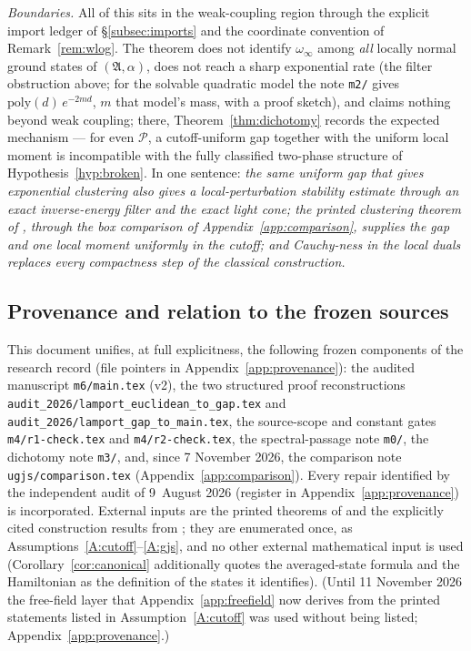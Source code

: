 \documentclass[11pt,a4paper]{article}
\theoremstyle{plain}
\theoremstyle{definition}
\theoremstyle{plain}
\theoremstyle{definition}
\newcommand{\A}{\mathfrak{A}}
\begin{document}
\emph{Boundaries.} All of this sits in the weak-coupling region through the explicit
import ledger of \S\ref{subsec:imports} and the coordinate convention of
Remark~\ref{rem:wlog}. The theorem does not identify $\omega_\infty$ among \emph{all}
locally normal ground states of $(\A,\alpha)$, does not reach a sharp exponential rate
(the filter obstruction above; for the solvable quadratic model the note \texttt{m2/} gives
$\mathrm{poly}(d)\,e^{-2md}$, $m$ that model's mass, with a proof sketch), and claims nothing
beyond weak coupling; there, Theorem~\ref{thm:dichotomy} records the expected mechanism --- for
even $\mathscr P$, a cutoff-uniform gap together with the uniform local moment is incompatible
with the fully classified two-phase structure of Hypothesis~\ref{hyp:broken}. In one sentence: \emph{the same uniform gap that gives
exponential clustering also gives a local-perturbation stability estimate through an
exact inverse-energy filter and the exact light cone; the printed clustering theorem of
\cite{GJS}, through the box comparison of Appendix~\ref{app:comparison}, supplies the gap
and one local moment uniformly in the cutoff; and
Cauchy-ness in the local duals replaces every compactness step of the classical
construction.}

\subsection*{Provenance and relation to the frozen sources}

This document unifies, at full explicitness, the following frozen components of the research
record (file pointers in Appendix~\ref{app:provenance}): the audited manuscript
\texttt{m6/main.tex} (v2), the two structured proof reconstructions
\texttt{audit\_2026/}\allowbreak\texttt{lamport\_euclidean\_to\_gap.tex} and
\texttt{audit\_2026/}\allowbreak\texttt{lamport\_gap\_to\_main.tex}, the source-scope and constant gates
\texttt{m4/r1-check.tex} and \texttt{m4/r2-check.tex}, the spectral-passage note \texttt{m0/},
the dichotomy note \texttt{m3/}, and, since 7 November 2026, the comparison note
\texttt{ugjs/comparison.tex} (Appendix~\ref{app:comparison}). Every repair identified by the independent audit of
9~August 2026 (register in Appendix~\ref{app:provenance}) is incorporated. External inputs are
the printed theorems of \cite{GJS} and the explicitly cited construction results from
\cite{GJ1,GJ2,GJ71,Rosen70,SimonBook,GRS75,GJExp}; they are enumerated once, as
Assumptions~\ref{A:cutoff}--\ref{A:gjs}, and no other external mathematical input is
used (Corollary~\ref{cor:canonical} additionally quotes the averaged-state formula
\cite[(2.3)--(2.5)]{GJ3} and the Hamiltonian \cite[(1.10)]{GJ3} as the definition of the states
it identifies).  (Until
11 November 2026 the free-field layer that Appendix~\ref{app:freefield} now derives from the
printed statements listed in Assumption~\ref{A:cutoff} was used without being listed;
Appendix~\ref{app:provenance}.)
\end{document}
